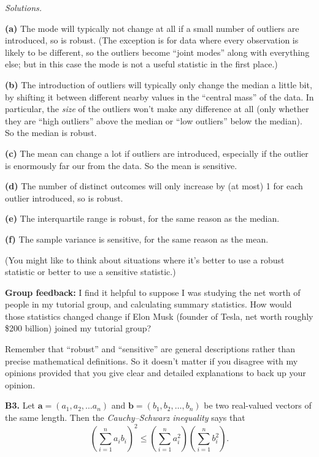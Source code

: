 \documentclass[
  a4paper,
]{book}
\theoremstyle{definition}
\theoremstyle{definition}
\theoremstyle{definition}
\theoremstyle{definition}
\theoremstyle{remark}
\begin{document}
\begin{myanswers}
\emph{Solutions.}

\textbf{(a)} The mode will typically not change at all if a small number of outliers are introduced, so is robust. (The exception is for data where every observation is likely to be different, so the outliers become ``joint modes'' along with everything else; but in this case the mode is not a useful statistic in the first place.)

\textbf{(b)} The introduction of outliers will typically only change the median a little bit, by shifting it between different nearby values in the ``central mass'' of the data. In particular, the \emph{size} of the outliers won't make any difference at all (only whether they are ``high outliers'' above the median or ``low outliers'' below the median). So the median is robust.

\textbf{(c)} The mean can change a lot if outliers are introduced, especially if the outlier is enormously far our from the data. So the mean is sensitive.

\textbf{(d)} The number of distinct outcomes will only increase by (at most) 1 for each outlier introduced, so is robust.

\textbf{(e)} The interquartile range is robust, for the same reason as the median.

\textbf{(f)} The sample variance is sensitive, for the same reason as the mean.

(You might like to think about situations where it's better to use a robust statistic or better to use a sensitive statistic.)

\textbf{Group feedback:} I find it helpful to suppose I was studying the net worth of people in my tutorial group, and calculating summary statistics. How would those statistics changed change if Elon Musk (founder of Tesla, net worth roughly \$200 billion) joined my tutorial group?

Remember that ``robust'' and ``sensitive'' are general descriptions rather than precise mathematical definitions. So it doesn't matter if you disagree with my opinions provided that you give clear and detailed explanations to back up your opinion.

\end{myanswers}

\textbf{B3.} Let \(\mathbf a = (a_1, a_2, \dots a_n)\) and \(\mathbf b = (b_1, b_2, \dots, b_n)\) be two real-valued vectors of the same length. Then the \emph{Cauchy--Schwarz inequality} says that
\[ \left( \sum_{i=1}^n a_i b_i \right)^2 \leq \left( \sum_{i=1}^n a_i^2 \right) \left(\sum_{i=1}^n b_i^2 \right) . \]
\end{document}
